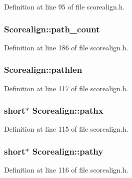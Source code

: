 Definition at line 95 of file scorealign.\+h.

\subsubsection[{\texorpdfstring{path\+\_\+count}{path_count}}]{ Scorealign\+::path\+\_\+count}\hypertarget{class_scorealign_af09a47eb9bc5af4ef21bc85bd5959e96}{}\label{class_scorealign_af09a47eb9bc5af4ef21bc85bd5959e96}


Definition at line 186 of file scorealign.\+h.

\subsubsection[{\texorpdfstring{pathlen}{pathlen}}]{ Scorealign\+::pathlen}\hypertarget{class_scorealign_a3a22e20e8be472e87e0f43443c930316}{}\label{class_scorealign_a3a22e20e8be472e87e0f43443c930316}


Definition at line 117 of file scorealign.\+h.

\subsubsection[{\texorpdfstring{pathx}{pathx}}]{\setlength{\rightskip}{0pt plus 5cm}short$\ast$ Scorealign\+::pathx}\hypertarget{class_scorealign_a9aa670b061ce18988086803992d7d1c5}{}\label{class_scorealign_a9aa670b061ce18988086803992d7d1c5}


Definition at line 115 of file scorealign.\+h.

\subsubsection[{\texorpdfstring{pathy}{pathy}}]{\setlength{\rightskip}{0pt plus 5cm}short$\ast$ Scorealign\+::pathy}\hypertarget{class_scorealign_a6c09342db2cad202c698da99c4ae0e98}{}\label{class_scorealign_a6c09342db2cad202c698da99c4ae0e98}


Definition at line 116 of file scorealign.\+h.

